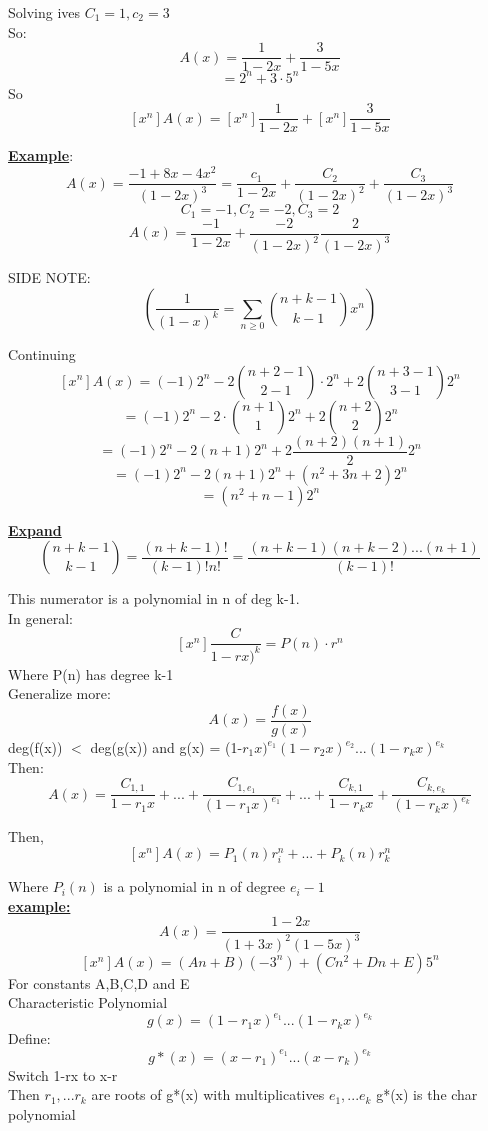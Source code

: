 \documentclass[12pt]{article}
\newcommand{\myt}[1]{\textbf{\underline{#1}}}
\begin{document}
	Solving ives $C_1 = 1, c_2 = 3$\\
	So:
	$$A(x) = \frac{1}{1-2x} + \frac{3}{1-5x}$$
	$$= 2^n + 3 \cdot 5^n$$
	So
	$$ [x^n]A(x) = [x^n]\frac{1}{1-2x} + [x^n]\frac{3}{1-5x}$$
	
	\myt{Example}:
	$$A(x) = \frac{-1 + 8x - 4x^2}{(1-2x)^3} = \frac{c_1}{1-2x} + \frac{C_2}{(1-2x)^2} + \frac{C_3}{(1-2x)^3}$$
	$$C_1 = -1, C_2 = -2, C_3 = 2$$
	$$A(x) = \frac{-1}{1-2x} + \frac{-2}{(1-2x)^2} \frac{2}{(1-2x)^3}$$
	
	SIDE NOTE:
	$$(\frac{1}{(1-x)^k} = \sum_{n \geq 0}{n+k-1 \choose k-1}x^n)$$
	
	Continuing
	$$[x^n]A(x) = (-1)2^n - 2{n+2-1 \choose 2-1} \cdot 2^n + 2{n + 3 - 1 \choose 3-1}2^n$$
	$$ = (-1)2^n - 2 \cdot {n+1 \choose 1}2^n + 2{n+2 \choose 2}2^n$$
	$$ = (-1)2^n - 2(n+1)2^n + 2\frac{(n+2)(n+1)}{2}2^n$$
	$$ = (-1)2^n - 2(n+1)2^n + (n^2 + 3n + 2)2^n$$
	$$ = (n^2 + n - 1)2^n$$
	
	\myt{Expand}
	$${n+k-1 \choose k-1} = \frac{(n+k-1)!}{(k-1)!n!} = \frac{(n+k-1)(n+k-2)...(n+1)}{(k-1)!}$$
	
	This numerator is a polynomial in n of deg k-1.\\
	In general:
	$$[x^n]\frac{C}{1-rx)^k} = P(n) \cdot r^n$$
	Where P(n) has degree k-1\\
	
	Generalize more:
	$$A(x) = \frac{f(x)}{g(x)}$$
	deg(f(x)) $<$ deg(g(x)) and g(x) = (1-$r_1x)^{e_1}(1-r_2x)^{e_2}...(1-r_kx)^{e_k}$\\
	Then:
	$$A(x) = \frac{C_{1,1}}{1-r_1x} + ... + \frac{C_{1,e_{1}}}{(1-r_1x)^{e_1}} + ... + \frac{C_{k,1}}{1-r_kx} + \frac{C_{k,e_{k}}}{(1-r_kx)^{e_k}}$$
	
	Then,
	$$[x^n]A(x) = P_1(n)r_i^n + ... + P_k(n)r_k^n$$
	
	Where $P_i(n)$ is a polynomial in n of degree $e_i - 1$\\
	
	\myt{example:} 
	$$A(x) = \frac{1-2x}{(1+3x)^2(1-5x)^3}$$
	$$[x^n]A(x) = (An + B)(-3^n) + (Cn^2 + Dn + E)5^n$$
	For constants A,B,C,D and E\\
	
	Characteristic Polynomial\\
	$$g(x) = (1-r_1x)^{e_1} ... (1-r_kx)^{e_k}$$
	Define:
	$$g*(x) = (x-r_1)^{e_1} ... (x-r_k)^{e_k}$$
	Switch 1-rx to x-r\\
	Then $r_1,...r_k$ are roots of g*(x) with multiplicatives $e_1,...e_k$ g*(x) is the char polynomial\\
		
		
\end{document}

